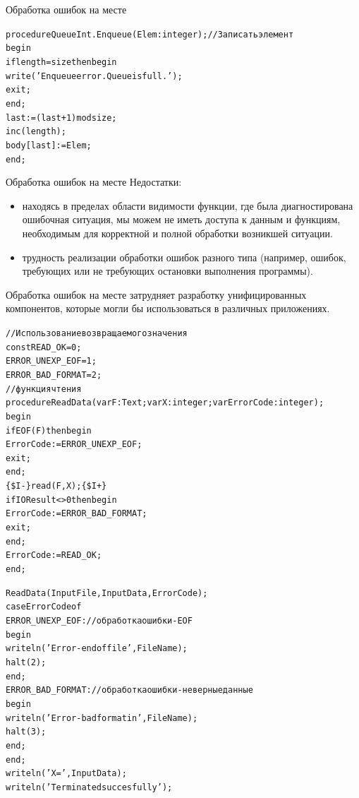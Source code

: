 \documentclass{beamer}
\begin{document}
\begin{frame}[fragile]{Обработка ошибок на месте}
\begin{alltt}
procedure QueueInt.Enqueue(Elem: integer); //Записать элемент
begin
  if length = size then begin
    write('Enqueue error. Queue is full.');
    exit;
  end;
  last := (last+1) mod size;
  inc(length);
  body[last] := Elem;
end;
\end{alltt}
\end{frame}

\begin{frame}[fragile]{Обработка ошибок на месте}
Недостатки: 
\begin{itemize}
\item находясь в пределах области видимости функции, где была диагностирована ошибочная ситуация, мы можем не иметь доступа к данным и функциям, необходимым для корректной и полной обработки возникшей ситуации.
\item трудность реализации обработки ошибок разного типа (например, ошибок,
требующих или не требующих остановки выполнения программы).
\end{itemize}
Обработка ошибок на месте затрудняет разработку унифицированных компонентов, которые могли бы использоваться в различных приложениях.
\end{frame}

\begin{frame}[fragile]
\begin{alltt}
//Использование возвращаемого значения
const READ_OK = 0;
      ERROR_UNEXP_EOF = 1;
      ERROR_BAD_FORMAT = 2;
//функция чтения
procedure ReadData(var F: Text; var X: integer; var ErrorCode: integer);
begin
  if EOF(F) then begin
    ErrorCode := ERROR_UNEXP_EOF;
    exit;
  end;
  \{\$I-\} read(F, X);  \{\$I+\}
  if IOResult <> 0 then begin
    ErrorCode := ERROR_BAD_FORMAT;
    exit;
  end;
  ErrorCode := READ_OK;
end; 
\end{alltt}
\end{frame}

\begin{frame}[fragile]
\begin{alltt}
  ReadData(InputFile, InputData, ErrorCode);
  case ErrorCode of
    ERROR_UNEXP_EOF: //обработка ошибки - EOF
      begin
        writeln('Error  - end of file ', FileName);
        halt(2);
      end;
    ERROR_BAD_FORMAT: //обработка ошибки - неверные данные
      begin
        writeln('Error  - bad format in', FileName);
        halt(3);
      end;
  end;
  writeln('X = ', InputData);
  writeln('Terminated succesfully');
\end{alltt}
\end{frame}
\end{document}
